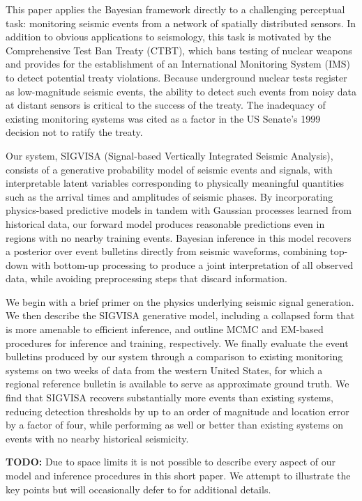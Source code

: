 \documentclass[twoside]{article} \usepackage{aistats2017}
\newcommand{\todo}[1]{{\color{red} \textbf{TODO:} {#1}}}
\begin{document}
This paper applies the Bayesian framework directly to a
challenging perceptual task: monitoring seismic events from a network
of spatially distributed sensors. In addition to obvious applications
to seismology, this task is motivated by the Comprehensive Test Ban
Treaty (CTBT), which bans testing of nuclear weapons and provides for
the establishment of an International Monitoring System (IMS) to
detect potential treaty violations. Because underground nuclear tests
register as low-magnitude seismic events, the ability to detect such
events from noisy data at distant sensors is critical to the success of the
treaty. The inadequacy of existing monitoring systems was cited as a
factor in the US Senate's 1999 decision not to ratify the treaty. 

Our system, SIGVISA (Signal-based Vertically Integrated Seismic
Analysis), consists of a generative probability model of seismic
events and signals, with interpretable latent variables corresponding
to physically meaningful quantities such as the arrival times and
amplitudes of seismic phases. By incorporating physics-based
predictive models in tandem with Gaussian processes learned from
historical data, our forward model produces reasonable predictions
even in regions with no nearby training events. Bayesian inference in
this model recovers a posterior over event bulletins directly from
seismic waveforms, combining top-down with bottom-up processing to
produce a joint interpretation of all observed data, while avoiding
preprocessing steps that discard information. 

We begin with a brief primer on the physics
underlying seismic signal generation. We then describe the SIGVISA generative
model, including a collapsed form that is more amenable to efficient
inference, and outline MCMC and EM-based procedures for inference and
training, respectively. We finally evaluate the event bulletins
produced by our system through a comparison to existing monitoring
systems on two weeks of data from the western United States, for which
a regional reference bulletin is available to serve as approximate
ground truth. We find that SIGVISA recovers substantially more events
than existing systems, reducing detection thresholds by up to an
order of magnitude and location error by a factor of four, while
performing as well or better than existing systems on events with no
nearby historical seismicity. 

\todo{Due to space limits it is not possible to describe every aspect
  of our model and inference procedures in this short paper. We
  attempt to illustrate the key points but will occasionally defer to 
  \citep{thesis} for additional details. }
\end{document}
